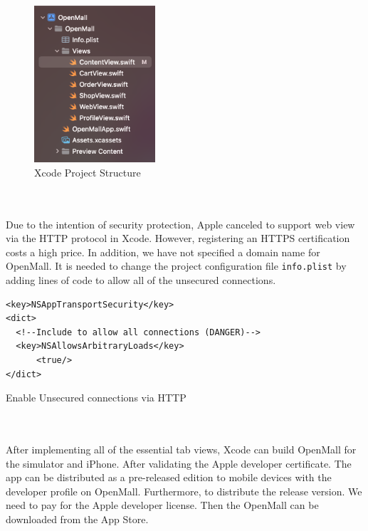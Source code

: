 \documentclass{article}
\begin{document}
\begin{figure}[!htp]
    \centering
    \includegraphics[width=0.4\textwidth]{file-struct.png}
    \caption{\label{fig:Xcode}Xcode Project Structure}
\end{figure}

\leavevmode
\\\\
Due to the intention of security protection, Apple canceled to support web view via the HTTP protocol in Xcode. However, registering an HTTPS certification costs a high price. In addition, we have not specified a domain name for OpenMall. It is needed to change the project configuration file \verb|info.plist| by adding lines of code to allow all of the unsecured connections.

\begin{listing}[!htp]
\begin{verbatim}
<key>NSAppTransportSecurity</key>
<dict>
  <!--Include to allow all connections (DANGER)-->
  <key>NSAllowsArbitraryLoads</key>
      <true/>
</dict>
\end{verbatim}
\caption{Enable Unsecured connections via HTTP}
\label{infoplist}
\end{listing}
\leavevmode
\\\\
After implementing all of the essential tab views, Xcode can build OpenMall for the simulator and iPhone. After validating the Apple developer certificate. The app can be distributed as a pre-released edition to mobile devices with the developer profile on OpenMall. Furthermore, to distribute the release version. We need to pay for the Apple developer license. Then the OpenMall can be downloaded from the App Store.
\end{document}
